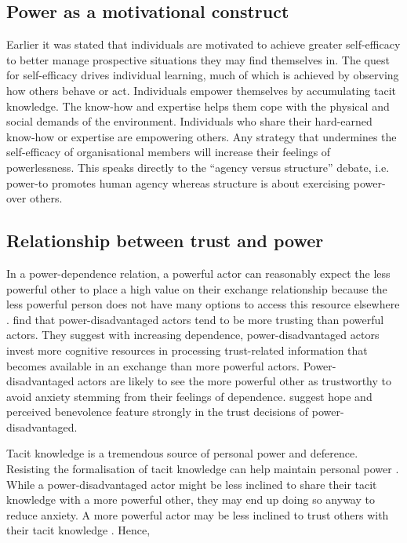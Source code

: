 \subsection{Power as a motivational construct}

Earlier it was stated that individuals are motivated to achieve greater self-efficacy to better manage prospective situations they may find themselves in. The quest for self-efficacy drives individual learning, much of which is achieved by observing how others behave or act. Individuals empower themselves by accumulating tacit knowledge. The know-how and expertise helps them cope with the physical and social demands of the environment. Individuals who share their hard-earned know-how or expertise are empowering others. Any strategy that undermines the self-efficacy of organisational members will increase their feelings of powerlessness. This speaks directly to the \enquote{agency versus structure} debate, i.e. power-to promotes human agency whereas structure is about exercising power-over others.

\subsection{Relationship between trust and power}

In a power-dependence relation, a powerful actor can reasonably expect the less powerful other to place a high value on their exchange relationship because the less powerful person does not have many options to access this resource elsewhere \citep{emerson1962power}. \citet{schilke2015power} find that power-disadvantaged actors tend to be more trusting than powerful actors. They suggest with increasing dependence, power-disadvantaged actors invest more cognitive resources in processing trust-related information that becomes available in an exchange than more powerful actors. Power-disadvantaged actors are likely to see the more powerful other as trustworthy to avoid anxiety stemming from their feelings of dependence. \citet{schilke2015power} suggest hope and perceived benevolence feature strongly in the trust decisions of power-disadvantaged. \medskip

Tacit knowledge is a tremendous source of personal power and deference. Resisting the formalisation of tacit knowledge can help maintain personal power \citep{schultze2004knowing}. While a power-disadvantaged actor might be less inclined to share their tacit knowledge with a more powerful other, they may end up doing so anyway to reduce anxiety. A more powerful actor may be less inclined to trust others with their tacit knowledge \citep{schilke2015power}. Hence, \bigskip

